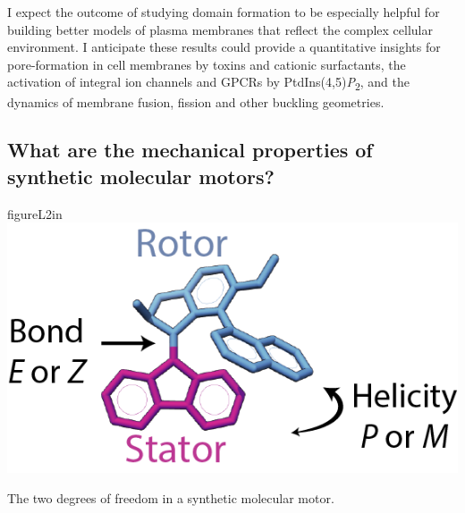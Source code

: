 \documentclass[11pt,notitlepage]{article}
\begin{document}
I expect the outcome of studying domain formation to be especially
helpful for building better models of plasma membranes that reflect the
complex cellular environment. I anticipate these results could provide a
quantitative insights for pore-formation in cell membranes by toxins and
cationic surfactants, the activation of integral ion channels and GPCRs
by PtdIns(4,5)\emph{P}\textsubscript{2}, and the dynamics of membrane
fusion, fission and other buckling geometries.

\hypertarget{what-are-the-mechanical-properties-of-synthetic-molecular-motors}{%
\subsection{What are the mechanical properties of synthetic molecular
motors?}\label{what-are-the-mechanical-properties-of-synthetic-molecular-motors}}


\begin{wrapfloat}{figure}{L}{2in}
\centering
\includegraphics{content/images/motor.png}
\caption{The two degrees of freedom in a synthetic molecular motor.}
\label{fig:motor-diagram}
\end{wrapfloat}
\end{document}

